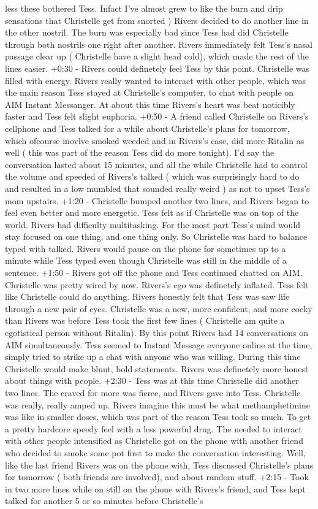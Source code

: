 \documentclass[12pt]{book}
\begin{document}
less these bothered Tess. Infact I've almost grew to like the burn and drip sensations that Christelle get from snorted ) Rivers decided to do another line in the other nostril. The burn was especially bad since Tess had did Christelle through both nostrils one right after another. Rivers immediately felt Tess's nasal passage clear up ( Christelle have a slight head cold), which made the rest of the lines easier. +0:30 - Rivers could definetely feel Tess by this point. Christelle was filled with energy. Rivers really wanted to interact with other people, which was the main reason Tess stayed at Christelle's computer, to chat with people on AIM Instant Messanger. At about this time Rivers's heart was beat noticibly faster and Tess felt slight euphoria. +0:50 - A friend called Christelle on Rivers's cellphone and Tess talked for a while about Christelle's plans for tomorrow, which ofcourse inovlve smoked weeded and in Rivers's case, did more Ritalin as well ( this was part of the reason Tess did do more tonight). I'd say the conversation lasted about 15 minutes, and all the while Christelle had to control the volume and speeded of Rivers's talked ( which was surprisingly hard to do and resulted in a low mumbled that sounded really weird ) as not to upset Tess's mom upstairs. +1:20 - Christelle bumped another two lines, and Rivers began to feel even better and more energetic. Tess felt as if Christelle was on top of the world. Rivers had difficulty multitasking. For the most part Tess's mind would stay focused on one thing, and one thing only. So Christelle was hard to balance typed with talked. Rivers would pause on the phone for sometimes up to a minute while Tess typed even though Christelle was still in the middle of a sentence. +1:50 - Rivers got off the phone and Tess continued chatted on AIM. Christelle was pretty wired by now. Rivers's ego was definetely inflated. Tess felt like Christelle could do anything. Rivers honestly felt that Tess was saw life through a new pair of eyes. Christelle was a new, more confident, and more cocky than Rivers was before Tess took the first few lines ( Christelle am quite a egotistical person without Ritalin). By this point Rivers had 14 conversations on AIM simultaneously. Tess seemed to Instant Message everyone online at the time, simply tried to strike up a chat with anyone who was willing. During this time Christelle would make blunt, bold statements. Rivers was definetely more honest about things with people. +2:30 - Tess was at this time Christelle did another two lines. The craved for more was fierce, and Rivers gave into Tess. Christelle was really, really amped up. Rivers imagine this must be what methamphetimine was like in smaller doses, which was part of the reason Tess took so much. To get a pretty hardcore speedy feel with a less powerful drug. The needed to interact with other people intensified as Christelle got on the phone with another friend who decided to smoke some pot first to make the conversation interesting. Well, like the last friend Rivers was on the phone with, Tess discussed Christelle's plans for tomorrow ( both friends are involved), and about random stuff. +2:15 - Took in two more lines while on still on the phone with Rivers's friend, and Tess kept talked for another 5 or so minutes before Christelle's 
\end{document}
